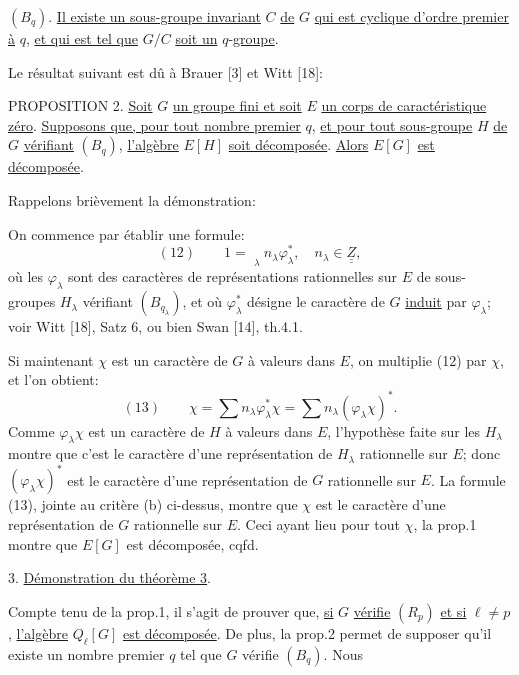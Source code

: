 
$(B_q)$. \uline{Il existe un sous-groupe invariant} $C$ \uline{de} $G$
\uline{qui est cyclique d'ordre premier à} $q$, \uline{et qui est tel que}
$G/C$ \uline{soit un} $q$-\uline{groupe}.

Le résultat suivant est dû à Brauer [3] et Witt [18]:

PROPOSITION 2. \uline{Soit} $G$ \uline{un groupe fini et soit} $E$
\uline{un corps de caractéristique zéro}. \uline{Supposons que, pour tout nombre premier}
$q$, \uline{et pour tout sous-groupe} $H$ \uline{de} $G$ \uline{vérifiant}
$(B_q)$, \uline{l'algèbre} $E[H]$ \uline{soit décomposée}. \uline{Alors}
$E[G]$ \uline{est décomposée}.

Rappelons brièvement la démonstration:

On commence par établir une formule:
\[
(12)\qquad 1=\underset{\lambda}{\quad}n_\lambda\varphi^*_\lambda,
\quad n_\lambda\in\underline{\underline Z},
\]
où les $\varphi_\lambda$ sont des caractères de représentations rationnelles sur
$E$ de sous-groupes $H_\lambda$ vérifiant $(B_{q_\lambda})$, et où
$\varphi^*_\lambda$ désigne le caractère de $G$ \uline{induit} par
$\varphi_\lambda$; voir Witt [18], Satz 6, ou bien Swan [14], th.4.1.

Si maintenant $\chi$ est un caractère de $G$ à valeurs dans $E$, on multiplie
(12) par $\chi$, et l'on obtient:
\[
(13)\qquad \chi=\sum n_\lambda\varphi^*_\lambda\chi
=\sum n_\lambda(\varphi_\lambda\chi)^*.
\]
Comme $\varphi_\lambda\chi$ est un caractère de $H$ à valeurs dans $E$,
l'hypothèse faite sur les $H_\lambda$ montre que c'est le caractère d'une
représentation de $H_\lambda$ rationnelle sur $E$; donc
$(\varphi_\lambda\chi)^*$ est le caractère d'une représentation de $G$
rationnelle sur $E$. La formule (13), jointe au critère (b) ci-dessus, montre
que $\chi$ est le caractère d'une représentation de $G$ rationnelle sur $E$.
Ceci ayant lieu pour tout $\chi$, la prop.1 montre que $E[G]$ est décomposée, cqfd.

3. \uline{Démonstration du théorème 3}.

Compte tenu de la prop.1, il s'agit de prouver que, \uline{si} $G$ \uline{vérifie}
$(R_p)$ \uline{et si} $\ell\ne p$, \uline{l'algèbre} $Q_\ell[G]$
\uline{est décomposée}. De plus, la prop.2 permet de supposer qu'il existe un
nombre premier $q$ tel que $G$ vérifie $(B_q)$. Nous
